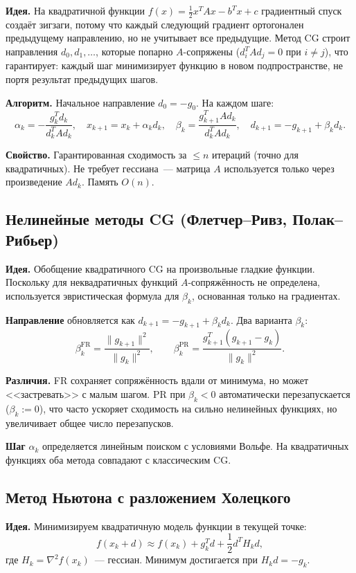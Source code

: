 \documentclass[12pt]{article}
\begin{document}
\textbf{Идея.} На квадратичной функции $f(x) = \frac{1}{2}x^TAx - b^Tx + c$ градиентный спуск создаёт зигзаги, потому что каждый следующий градиент ортогонален предыдущему направлению, но не учитывает все предыдущие. Метод CG строит направления $d_0, d_1, \ldots$, которые попарно $A$-сопряжены ($d_i^T A d_j = 0$ при $i \neq j$), что гарантирует: каждый шаг минимизирует функцию в новом подпространстве, не портя результат предыдущих шагов.

\textbf{Алгоритм.} Начальное направление $d_0 = -g_0$. На каждом шаге:
\[
    \alpha_k = -\frac{g_k^T d_k}{d_k^T A d_k}, \quad
    x_{k+1} = x_k + \alpha_k d_k, \quad
    \beta_k = \frac{g_{k+1}^T A d_k}{d_k^T A d_k}, \quad
    d_{k+1} = -g_{k+1} + \beta_k d_k.
\]

\textbf{Свойство.} Гарантированная сходимость за $\leq n$ итераций (точно для квадратичных). Не требует гессиана~--- матрица $A$ используется только через произведение $Ad_k$. Память $O(n)$.

\subsection{Нелинейные методы CG (Флетчер--Ривз, Полак--Рибьер)}

\textbf{Идея.} Обобщение квадратичного CG на произвольные гладкие функции. Поскольку для неквадратичных функций $A$-сопряжённость не определена, используется эвристическая формула для $\beta_k$, основанная только на градиентах.

\textbf{Направление} обновляется как $d_{k+1} = -g_{k+1} + \beta_k d_k$. Два варианта $\beta_k$:
\[
    \beta_k^{\text{FR}} = \frac{\|g_{k+1}\|^2}{\|g_k\|^2}, \qquad
    \beta_k^{\text{PR}} = \frac{g_{k+1}^T(g_{k+1} - g_k)}{\|g_k\|^2}.
\]

\textbf{Различия.} FR сохраняет сопряжённость вдали от минимума, но может <<застревать>> с малым шагом. PR при $\beta_k < 0$ автоматически перезапускается ($\beta_k := 0$), что часто ускоряет сходимость на сильно нелинейных функциях, но увеличивает общее число перезапусков.

\textbf{Шаг} $\alpha_k$ определяется линейным поиском с условиями Вольфе. На квадратичных функциях оба метода совпадают с классическим CG.

\subsection{Метод Ньютона с разложением Холецкого}

\textbf{Идея.} Минимизируем квадратичную модель функции в текущей точке:
\[
    f(x_k + d) \approx f(x_k) + g_k^T d + \frac{1}{2} d^T H_k d,
\]
где $H_k = \nabla^2 f(x_k)$~--- гессиан. Минимум достигается при $H_k d = -g_k$.
\end{document}
